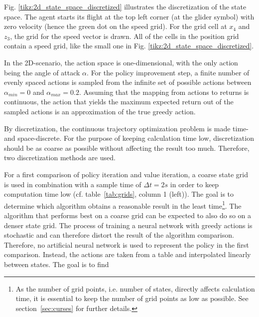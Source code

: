 Fig. \ref{tikz:2d_state_space_discretized} illustrates the discretization of the state space. The agent starts its flight at the top left corner (at the glider symbol) with zero velocity (hence the green dot on the speed grid). For the grid cell at $x_4$ and $z_3$, the grid for the speed vector is drawn. All of the cells in the position grid contain a speed grid, like the small one in Fig. \ref{tikz:2d_state_space_discretized}.

In the 2D-scenario, the action space is one-dimensional, with the only action being the angle of attack $\alpha$. For the policy improvement step, a finite number of evenly spaced actions is sampled from the infinite set of possible actions between $\alpha_{min} = 0$ and $\alpha_{max}=0.2$. Assuming that the mapping from actions to returns is continuous, the action that yields the maximum expected return out of the sampled actions is an approximation of the true greedy action.

By discretization, the continuous trajectory optimization problem is made time- and space-discrete. For the purpose of keeping calculation time low, discretization should be as coarse as possible without affecting the result too much. Therefore, two discretization methods are used. 

For a first comparison of policy iteration and value iteration, a coarse state grid is used in combination with a sample time of $\Delta t = 2s$ in order to keep computation time low (cf. table~\ref{tab:grids}, column 1 (left)). The goal is to determine which algorithm obtains a reasonable result in the least time\footnote{As the number of grid points, i.e. number of states, directly affects calculation time, it is essential to keep the number of grid points as low as possible. See section~\ref{sec:curses} for further details.}. The algorithm that performs best on a coarse grid can be expected to also do so on a denser state grid.
The process of training a neural network with greedy actions is stochastic and can therefore distort the result of the algorithm comparison. Therefore, no artificial neural network is used to represent the policy in the first comparison. Instead, the actions are taken from a table and interpolated linearly between states. The goal is to find 

